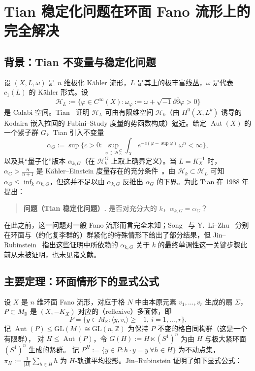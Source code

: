 \documentclass[11pt,a4paper]{article}
\theoremstyle{definition}
\theoremstyle{remark}
\DeclareMathOperator{\Aut}{Aut}
\newcommand{\Z}{\mathbb{Z}}
\newcommand{\R}{\mathbb{R}}
\begin{document}
\section{Tian 稳定化问题在环面 Fano 流形上的完全解决}

\subsection{背景：Tian 不变量与稳定化问题}

设 $(X,L,\omega)$ 是 $n$ 维极化 Kähler 流形，$L$ 是其上的极丰富线丛，$\omega$ 是代表 $c_1(L)$ 的
Kähler 形式。设
\[
  \mathcal{H}_L := \{\varphi \in C^\infty(X) : \omega_\varphi := \omega + \sqrt{-1}\partial\bar\partial \varphi > 0\}
\]
是 Calabi 空间。Tian~\cite{Tian1987} 证明 $\mathcal{H}_L$ 可由有限维空间 $\mathcal{H}_k$（由
$H^0(X,L^k)$ 诱导的 Kodaira 嵌入拉回的 Fubini--Study 度量的势函数构成）逼近。给定 $\Aut(X)$ 的
一个紧子群 $G$，Tian 引入不变量
\[
  \alpha_G := \sup\Big\{c>0 : \sup_{\varphi \in \mathcal{H}_L^G} \int_X e^{-c(\varphi - \sup \varphi)}\,\omega^n < \infty\Big\},
\]
以及其“量子化”版本 $\alpha_{k,G}$（在 $\mathcal{H}_k^G$ 上取上确界定义）。当 $L = K_X^{-1}$ 时，
$\alpha_G > \tfrac{n}{n+1}$ 是 Kähler--Einstein 度量存在的充分条件~\cite{Tian1987}。由 $\mathcal{H}_k
\subset \mathcal{H}_L$ 可知 $\alpha_G \le \inf_k \alpha_{k,G}$，但这并不足以由 $\alpha_{k,G}$ 反推出
$\alpha_G$ 的下界。为此 Tian 在 1988 年提出：

\begin{quote}
\textbf{问题（Tian 稳定化问题）.} 是否对充分大的 $k$，$\alpha_{k,G} = \alpha_G$？
\end{quote}

在此之前，这一问题对一般 Fano 流形而言完全未知；Song~\cite{Song2005} 与 Y.~Li--Zhu~\cite{LZ2021}
分别在环面与（约化复李群的）群紧化的特殊情形下给出了部分结果，但 Jin--Rubinstein~\cite[\S 1.3]{JR2025}
指出这些证明中所依赖的 $\alpha_{k,G}$ 关于 $k$ 的最终单调性这一关键步骤此前从未被证明，也未见诸文献。

\subsection{主要定理：环面情形下的显式公式}

设 $X$ 是 $n$ 维环面 Fano 流形，对应于格 $N$ 中由本原元素 $v_1,\dots,v_r$ 生成的扇 $\Sigma$，
$P \subset M_\R$ 是 $(X,-K_X)$ 对应的（reflexive）多面体，即
\[
  P = \{y \in M_\R : \langle y, v_i\rangle \ge -1,\ i=1,\dots,r\}.
\]
记 $\Aut(P) \le \mathrm{GL}(M) \cong \mathrm{GL}(n,\Z)$ 为保持 $P$ 不变的格自同构群（这是一个有限群），
对 $H \le \Aut(P)$，令 $G(H) := H \ltimes (S^1)^n$ 为由 $H$ 与极大紧环面 $(S^1)^n$ 生成的紧群。
记 $P^H := \{y \in P : h\cdot y = y\ \forall h \in H\}$ 为不动点集，$\pi_H := \frac{1}{|H|}\sum_{h\in H} h$
为 $H$-轨道平均投影。Jin--Rubinstein 证明了如下显式公式：
\end{document}
